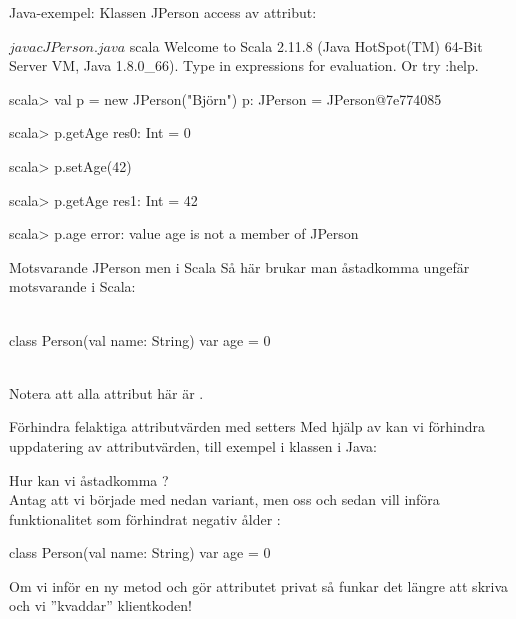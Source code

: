 \begin{Slide}{Java-exempel: Klassen JPerson}\SlideFontSmall
{} access av  attribut:
\vspace{-1em}\begin{multicols}{2}

\columnbreak

\begin{REPLnonum}
$ javac JPerson.java
$ scala
Welcome to Scala 2.11.8 (Java HotSpot(TM) 64-Bit Server VM, Java 1.8.0_66).
Type in expressions for evaluation. Or try :help.

scala> val p = new JPerson("Björn")
p: JPerson = JPerson@7e774085

scala> p.getAge
res0: Int = 0

scala> p.setAge(42)

scala> p.getAge
res1: Int = 42

scala> p.age
error:
value age is not a member of JPerson
\end{REPLnonum}
\end{multicols}
\end{Slide}


\begin{Slide}{Motsvarande JPerson men i Scala}
Så här brukar man åstadkomma ungefär motsvarande i Scala: \\~
\begin{Code}[basicstyle=\SlideFontSize{13}{15}\ttfamily\selectfont]
class Person(val name: String) {
  var age = 0
}
\end{Code}
~\\
Notera att alla attribut här är .
\end{Slide}


\begin{Slide}{Förhindra felaktiga attributvärden med setters}\SlideFontSmall
Med hjälp av  kan vi förhindra  uppdatering av attributvärden, till exempel  i klassen  i Java:
\begin{Code}[language=Java]
    public void setAge(int age){
        if (age >= 0) {
            this.age = age;
        else {
            this.age = 0;
        }
    }
\end{Code}
Hur kan vi åstadkomma ? \\
\pause
Antag att vi började med nedan variant, men  oss och sedan vill införa funktionalitet som förhindrat negativ ålder :
\begin{Code}
class Person(val name: String) {
  var age = 0
}
\end{Code}
Om vi inför en ny metod  och gör attributet  privat så funkar det  längre att skriva   och vi ''kvaddar'' klientkoden! \code{  :(}
\end{Slide}



